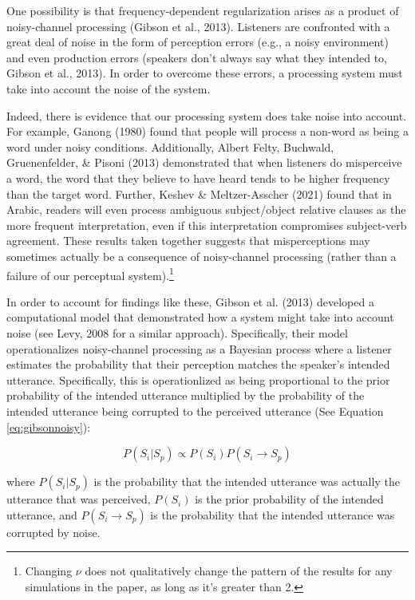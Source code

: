 \documentclass[10pt, letterpaper]{article}
\begin{document}
One possibility is that frequency-dependent regularization arises as a
product of noisy-channel processing (Gibson et al., 2013). Listeners are
confronted with a great deal of noise in the form of perception errors
(e.g., a noisy environment) and even production errors (speakers don't
always say what they intended to, Gibson et al., 2013). In order to
overcome these errors, a processing system must take into account the
noise of the system.

Indeed, there is evidence that our processing system does take noise
into account. For example, Ganong (1980) found that people will process
a non-word as being a word under noisy conditions. Additionally, Albert
Felty, Buchwald, Gruenenfelder, \& Pisoni (2013) demonstrated that when
listeners do misperceive a word, the word that they believe to have
heard tends to be higher frequency than the target word. Further, Keshev
\& Meltzer-Asscher (2021) found that in Arabic, readers will even
process ambiguous subject/object relative clauses as the more frequent
interpretation, even if this interpretation compromises subject-verb
agreement. These results taken together suggests that misperceptions may
sometimes actually be a consequence of noisy-channel processing (rather
than a failure of our perceptual system).\footnote{Changing \(\nu\) does
  not qualitatively change the pattern of the results for any
  simulations in the paper, as long as it's greater than 2.}

In order to account for findings like these, Gibson et al. (2013)
developed a computational model that demonstrated how a system might
take into account noise (see Levy, 2008 for a similar approach).
Specifically, their model operationalizes noisy-channel processing as a
Bayesian process where a listener estimates the probability that their
perception matches the speaker's intended utterance. Specifically, this
is operationlized as being proportional to the prior probability of the
intended utterance multiplied by the probability of the intended
utterance being corrupted to the perceived utterance (See Equation
\ref{eq:gibsonnoisy}):

\begin{equation}
\label{eq:gibsonnoisy}
P(S_i|S_p) \propto P(S_i) P(S_i \to S_p)
\end{equation}

where \(P(S_i|S_p)\) is the probability that the intended utterance was
actually the utterance that was perceived, \(P(S_i)\) is the prior
probability of the intended utterance, and \(P(S_i \to S_p)\) is the
probability that the intended utterance was corrupted by noise.
\end{document}
